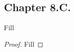 \subsection*{Chapter 8.C. }


\begin{exercise}{1}
  Fill
\end{exercise}
\begin{proof}
 Fill
\end{proof}